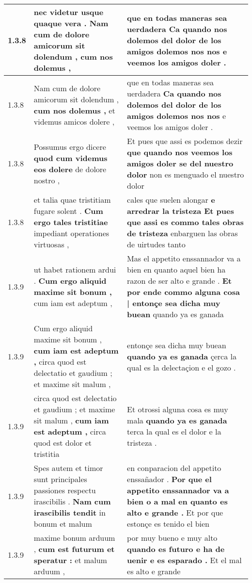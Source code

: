 \begin{tabular}{|p{1cm}|p{6.5cm}|p{6.5cm}|}
1.3.8 & nec videtur usque quaque vera . \textbf{ Nam cum de dolore amicorum sit dolendum , } cum nos dolemus , & que en todas maneras sea uerdadera \textbf{ Ca quando nos dolemos del dolor de los amigos dolemos nos nos } e veemos los amigos doler . \\\hline
1.3.8 & Nam cum de dolore amicorum sit dolendum , \textbf{ cum nos dolemus , } et videmus amicos dolere , & que en todas maneras sea uerdadera \textbf{ Ca quando nos dolemos del dolor de los amigos dolemos nos nos } e veemos los amigos doler . \\\hline
1.3.8 & Possumus ergo dicere \textbf{ quod cum videmus eos dolere } de dolore nostro , & Et pues que assi es podemos dezir \textbf{ que quando nos veemos los amigos doler se del nuestro dolor } non es menguado el nuestro dolor \\\hline
1.3.8 & et talia quae tristitiam fugare solent . \textbf{ Cum ergo tales tristitiae } impediant operationes virtuosas , & cales que suelen alongar \textbf{ e arredrar la tristeza Et pues que assi es commo tales obras de tristeza } enbarguen las obras de uirtudes tanto \\\hline
1.3.9 & ut habet rationem ardui . \textbf{ Cum ergo aliquid maxime sit bonum , } cum iam est adeptum , & Mas el appetito enssannador va a bien en quanto aquel bien ha razon de ser alto e grande . \textbf{ Et por ende commo alguna cosa | entonçe sea dicha muy buean } quando ya es ganada \\\hline
1.3.9 & Cum ergo aliquid maxime sit bonum , \textbf{ cum iam est adeptum , } circa quod est delectatio et gaudium ; et maxime sit malum , & entonçe sea dicha muy buean \textbf{ quando ya es ganada } çerca la qual es la delectaçion e el gozo . \\\hline
1.3.9 & circa quod est delectatio et gaudium ; et maxime sit malum , \textbf{ cum iam est adeptum , } circa quod est dolor et tristitia & Et otrossi alguna cosa es muy mala \textbf{ quando ya es ganada } terca la qual es el dolor e la tristeza . \\\hline
1.3.9 & Spes autem et timor sunt principales passiones respectu irascibilis . \textbf{ Nam cum irascibilis tendit } in bonum et malum & en conparacion del appetito enssañador . \textbf{ Por que el appetito enssannador va a bien o a mal en quanto es alto e grande . } Et por que estonçe es tenido el bien \\\hline
1.3.9 & maxime bonum arduum , \textbf{ cum est futurum et speratur : } et malum arduum , & por muy bueno e muy alto \textbf{ quando es futuro e ha de uenir e es esparado . } Et el mal es alto e grande \\\hline

\end{tabular}
